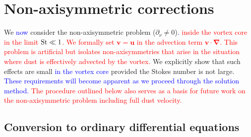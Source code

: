 \documentclass[apj]{emulateapj}
\renewcommand{\v}[1]{{\boldsymbol{#1}}} %
\def\blue#1{\textcolor{blue}{#1}}
\def\red#1{\textcolor{red}{#1}}
\newcommand{\del}{\v{\nabla}}
\newcommand{\grad}{\del}
\newcommand{\Fig}[1]{Fig.~\ref{#1}}
\newcommand{\fig}[1]{\Fig{#1}}
\newcommand{\St}{{\rm St}}
\begin{document}
%


\section{Non-axisymmetric corrections}
\label{sect:nonaxisymmetric} 

We \blue{now} consider the non-axisymmetric problem ($\partial_\nu\neq0$)\blue{.} 
\red{inside the vortex core in the limit $\St \ll 1$. We formally set $\v{v} = \v{u}$ in the advection term 
$\v{v}\cdot\del$. This problem is artificial but isolates non-axisymmetries that arise in the 
situation where dust is effectively advected by the vortex.} We explicitly show that such effects are small 
\blue{in the vortex core} provided the Stokes number is not large. \blue{These requirements will become
apparent as we proceed through the solution method.} \red{The procedure outlined below also serves as a basis for future 
work on the non-axisymmetric problem including full dust velocity.}


\subsection{Conversion to ordinary differential equations}
\end{document}

